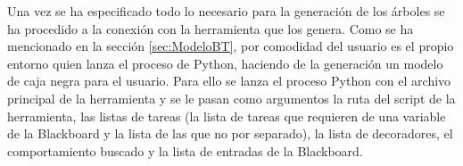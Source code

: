 Una vez se ha especificado todo lo necesario para la generación de los árboles se ha procedido a la conexión con la herramienta que los genera.
Como se ha mencionado en la sección \ref{sec:ModeloBT}, por comodidad del usuario es el propio entorno quien lanza el proceso de Python, haciendo de la generación un modelo de caja negra para el usuario.
Para ello se lanza el proceso Python con el archivo principal de la herramienta y se le pasan como argumentos la ruta del script de la herramienta, las listas de tareas (la lista de tareas que requieren de una variable de la Blackboard y la lista de las que no por separado), la lista de decoradores, el comportamiento buscado y la lista de entradas de la Blackboard. 